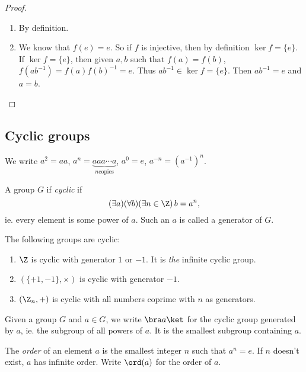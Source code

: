 \documentclass[a4paper]{article}
\begin{document}
\begin{proof}\leavevmode
  \begin{enumerate}
    \item By definition.
    \item We know that $f(e) = e$. So if $f$ is injective, then by definition $\ker f = \{e\}$. If $\ker f = \{e\}$, then given $a, b$ such that $f(a) = f(b)$, $f(ab^{-1}) = f(a)f(b)^{-1} = e$. Thus $ab^{-1}\in \ker f = \{e\}$.  Then $ab^{-1} = e$ and $a = b$.
  \end{enumerate}
\end{proof}

\subsection{Cyclic groups}
\begin{notation}
  We write $a^2 = aa$, $a^n = \underbrace{aaa\cdots a}_{n \text{copies}}$, $a^0 = e$, $a^{-n} = (a^{-1})^n$.
\end{notation}

\begin{defi}
  A group $G$ if \emph{cyclic} if
  \[
    (\exists a)(\forall b)(\exists n\in\Z)\, b = a^n,
  \]
  ie. every element is some power of $a$. Such an $a$ is called a generator of $G$.
\end{defi}

\begin{eg}
  The following groups are cyclic:
  \begin{enumerate}
    \item $\Z$ is cyclic with generator $1$ or $-1$. It is \emph{the} infinite cyclic group.
    \item $(\{+1, -1\}, \times)$ is cyclic with generator $-1$.
    \item $(\Z_n, +)$ is cyclic with all numbers coprime with $n$ as generators.
  \end{enumerate}
\end{eg}

\begin{notation}
  Given a group $G$ and $a\in G$, we write $\bra a\ket$ for the cyclic group generated by $a$, ie. the subgroup of all powers of $a$. It is the smallest subgroup containing $a$.
\end{notation}

\begin{defi}
  The \emph{order} of an element $a$ is the smallest integer $n$ such that $a^n = e$. If $n$ doesn't exist, $a$ has infinite order. Write $\ord(a)$ for the order of $a$.
\end{defi}
\end{document}
